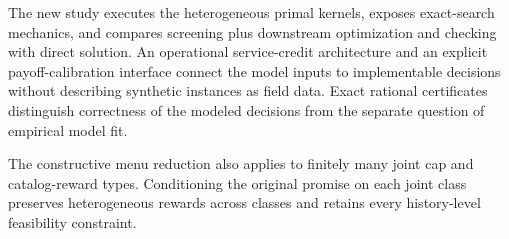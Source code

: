 The new study executes the heterogeneous primal kernels, exposes exact-search mechanics, and compares screening plus downstream optimization and checking with direct solution. An operational service-credit architecture and an explicit payoff-calibration interface connect the model inputs to implementable decisions without describing synthetic instances as field data. Exact rational certificates distinguish correctness of the modeled decisions from the separate question of empirical model fit.

The constructive menu reduction also applies to finitely many joint cap and catalog-reward types. Conditioning the original promise on each joint class preserves heterogeneous rewards across classes and retains every history-level feasibility constraint.
